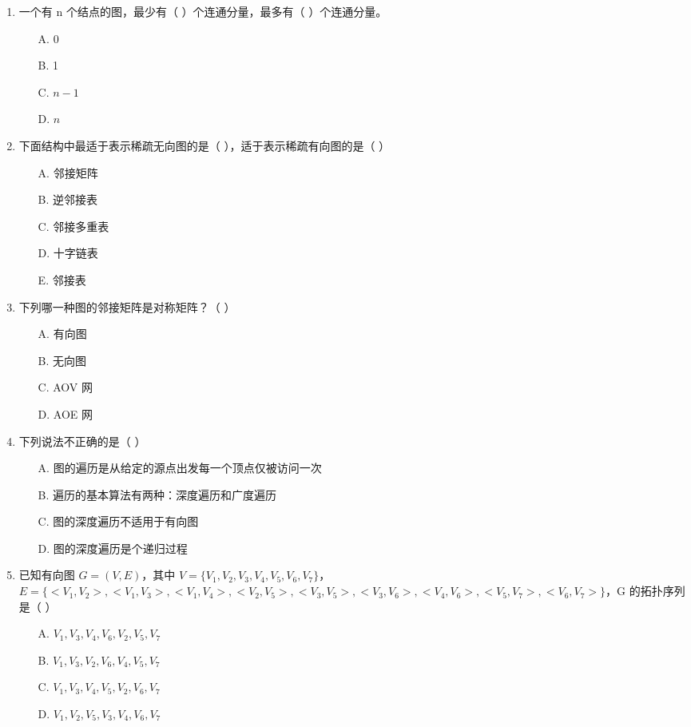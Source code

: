 \documentclass[12pt, a4paper]{article}
\begin{document}
\begin{enumerate}[label=\arabic*.]
	\item 一个有 n 个结点的图，最少有（ ）个连通分量，最多有（ ）个连通分量。
	      \begin{enumerate}
		      \item[A.] 0
		      \item[B.] 1
		      \item[C.] $n-1$
		      \item[D.] $n$
	      \end{enumerate}

	\item 下面结构中最适于表示稀疏无向图的是（ ），适于表示稀疏有向图的是（ ）
	      \begin{enumerate}
		      \item[A.] 邻接矩阵
		      \item[B.] 逆邻接表
		      \item[C.] 邻接多重表
		      \item[D.] 十字链表
		      \item[E.] 邻接表
	      \end{enumerate}

	\item 下列哪一种图的邻接矩阵是对称矩阵？（ ）
	      \begin{enumerate}
		      \item[A.] 有向图
		      \item[B.] 无向图
		      \item[C.] AOV 网
		      \item[D.] AOE 网
	      \end{enumerate}

	\item 下列说法不正确的是（ ）
	      \begin{enumerate}
		      \item[A.] 图的遍历是从给定的源点出发每一个顶点仅被访问一次
		      \item[B.] 遍历的基本算法有两种：深度遍历和广度遍历
		      \item[C.] 图的深度遍历不适用于有向图
		      \item[D.] 图的深度遍历是个递归过程
	      \end{enumerate}

	\item 已知有向图 $G=(V,E)$，其中 $V=\{V_1, V_2, V_3, V_4, V_5, V_6, V_7\}$，$E=\{<V_1, V_2>, <V_1, V_3>, <V_1, V_4>, <V_2, V_5>, <V_3, V_5>, <V_3, V_6>, <V_4, V_6>, <V_5, V_7>, <V_6, V_7>\}$，G 的拓扑序列是（ ）
	      \begin{enumerate}
		      \item[A.] $V_1, V_3, V_4, V_6, V_2, V_5, V_7$
		      \item[B.] $V_1, V_3, V_2, V_6, V_4, V_5, V_7$
		      \item[C.] $V_1, V_3, V_4, V_5, V_2, V_6, V_7$
		      \item[D.] $V_1, V_2, V_5, V_3, V_4, V_6, V_7$
	      \end{enumerate}


\end{enumerate}
\end{document}

